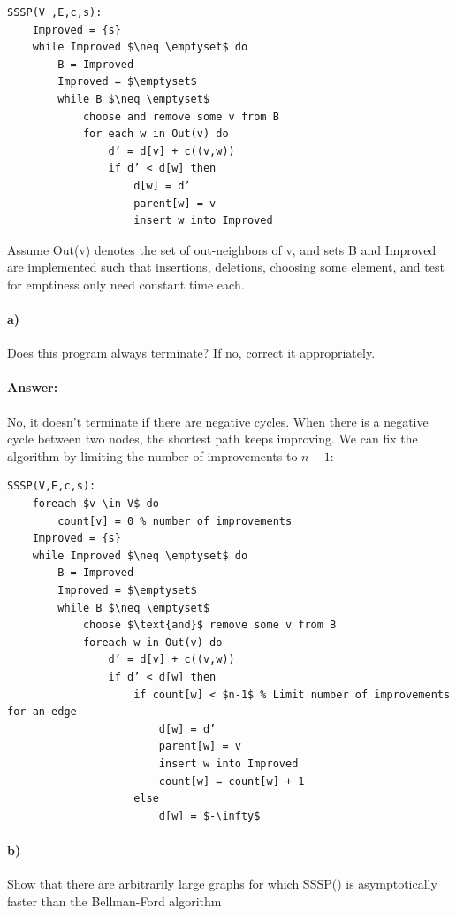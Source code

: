 \documentclass[a4paper]{article}
\begin{document}
\begin{lstlisting}[mathescape]
SSSP(V ,E,c,s):
    Improved = {s}
    while Improved $\neq \emptyset$ do
        B = Improved
        Improved = $\emptyset$
        while B $\neq \emptyset$
            choose and remove some v from B
            for each w in Out(v) do
                d’ = d[v] + c((v,w))
                if d’ < d[w] then
                    d[w] = d’
                    parent[w] = v
                    insert w into Improved
\end{lstlisting}

Assume Out(v) denotes the set of out-neighbors of v, and sets B and Improved are implemented such that insertions, deletions, choosing some element, and test for emptiness only need constant time each.

\paragraph{a)} Does this program always terminate? If no, correct it appropriately.

\paragraph{Answer:}

No, it doesn't terminate if there are negative cycles. When there is a negative cycle between two nodes, the shortest path keeps improving. We can fix the algorithm by limiting the number of improvements to $n-1$:

\begin{lstlisting}[mathescape, commentstyle=\color{red}, keywordstyle=\color{blue}]
SSSP(V,E,c,s):
    foreach $v \in V$ do
        count[v] = 0 % number of improvements
    Improved = {s}
    while Improved $\neq \emptyset$ do
        B = Improved
        Improved = $\emptyset$
        while B $\neq \emptyset$
            choose $\text{and}$ remove some v from B
            foreach w in Out(v) do
                d’ = d[v] + c((v,w))
                if d’ < d[w] then
                    if count[w] < $n-1$ % Limit number of improvements for an edge
                        d[w] = d’
                        parent[w] = v
                        insert w into Improved
                        count[w] = count[w] + 1
                    else
                        d[w] = $-\infty$
\end{lstlisting}


\paragraph{b)} Show that there are arbitrarily large graphs for which SSSP() is asymptotically faster than the Bellman-Ford algorithm
\end{document}
